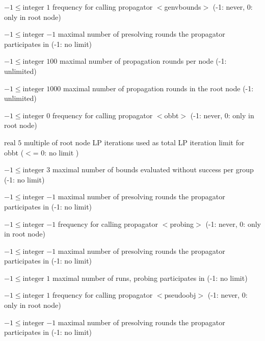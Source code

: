 %
{$-1\leq\textrm{integer}$}%
{$1$}%
{frequency for calling propagator $<$genvbounds$>$ (-1: never, 0: only in root node)}%
{}

%
{$-1\leq\textrm{integer}$}%
{$-1$}%
{maximal number of presolving rounds the propagator participates in (-1: no limit)}%
{}

%
{$-1\leq\textrm{integer}$}%
{$100$}%
{maximal number of propagation rounds per node (-1: unlimited)}%
{}

%
{$-1\leq\textrm{integer}$}%
{$1000$}%
{maximal number of propagation rounds in the root node (-1: unlimited)}%
{}

%
{$-1\leq\textrm{integer}$}%
{$0$}%
{frequency for calling propagator $<$obbt$>$ (-1: never, 0: only in root node)}%
{}

%
{$\textrm{real}$}%
{$5$}%
{multiple of root node LP iterations used as total LP iteration limit for obbt ($<$= 0: no limit )}%
{}

%
{$-1\leq\textrm{integer}$}%
{$3$}%
{maximal number of bounds evaluated without success per group (-1: no limit)}%
{}

%
{$-1\leq\textrm{integer}$}%
{$-1$}%
{maximal number of presolving rounds the propagator participates in (-1: no limit)}%
{}

%
{$-1\leq\textrm{integer}$}%
{$-1$}%
{frequency for calling propagator $<$probing$>$ (-1: never, 0: only in root node)}%
{}

%
{$-1\leq\textrm{integer}$}%
{$-1$}%
{maximal number of presolving rounds the propagator participates in (-1: no limit)}%
{}

%
{$-1\leq\textrm{integer}$}%
{$1$}%
{maximal number of runs, probing participates in (-1: no limit)}%
{}

%
{$-1\leq\textrm{integer}$}%
{$1$}%
{frequency for calling propagator $<$pseudoobj$>$ (-1: never, 0: only in root node)}%
{}

%
{$-1\leq\textrm{integer}$}%
{$-1$}%
{maximal number of presolving rounds the propagator participates in (-1: no limit)}%
{}

